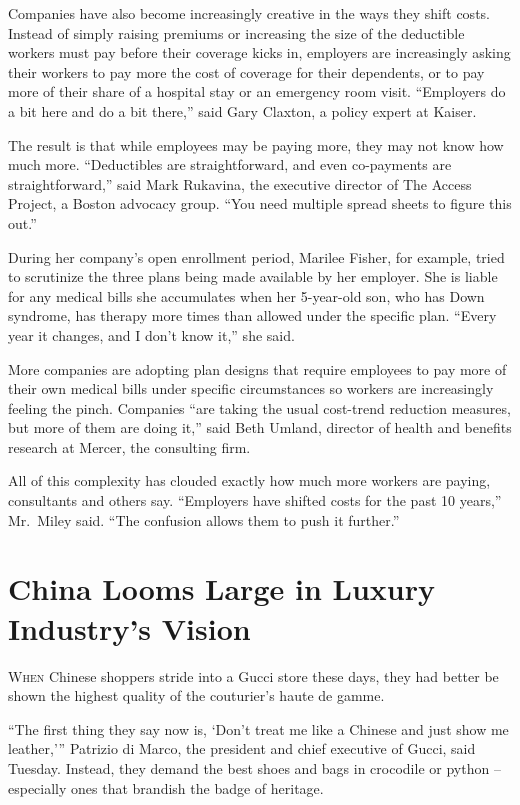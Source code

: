 ﻿\documentclass[12pt]{article}
\begin{document}
Companies have also become increasingly creative in the ways they shift costs. Instead of simply
raising premiums or increasing the size of the deductible workers must pay before their coverage
kicks in, employers are increasingly asking their workers to pay more the cost of coverage for their
dependents, or to pay more of their share of a hospital stay or an emergency room visit. ``Employers
do a bit here and do a bit there,'' said Gary Claxton, a policy expert at Kaiser.

The result is that while employees may be paying more, they may not know how much more.
``Deductibles are straightforward, and even co-payments are straightforward,'' said Mark Rukavina,
the executive director of The Access Project, a Boston advocacy group. ``You need multiple spread
sheets to figure this out.''

During her company's open enrollment period, Marilee Fisher, for example, tried to scrutinize the
three plans being made available by her employer. She is liable for any medical bills she
accumulates when her 5-year-old son, who has Down syndrome, has therapy more times than allowed
under the specific plan. ``Every year it changes, and I don't know it,'' she said.

More companies are adopting plan designs that require employees to pay more of their own medical
bills under specific circumstances so workers are increasingly feeling the pinch. Companies ``are
taking the usual cost-trend reduction measures, but more of them are doing it,'' said Beth Umland,
director of health and benefits research at Mercer, the consulting firm.

All of this complexity has clouded exactly how much more workers are paying, consultants and others
say. ``Employers have shifted costs for the past 10 years,'' Mr.~Miley said. ``The confusion allows
them to push it further.''

\section{China Looms Large in Luxury Industry's Vision}

\lettrine{W}{hen} Chinese shoppers stride into a Gucci store these days,
they had better be shown the highest quality of the couturier's haute de gamme.

``The first thing they say now is, `Don't treat me like a Chinese and just show me leather,'''
Patrizio di Marco, the president and chief executive of Gucci, said Tuesday. Instead, they demand
the best shoes and bags in crocodile or python -- especially ones that brandish the badge of
heritage.
\end{document}
